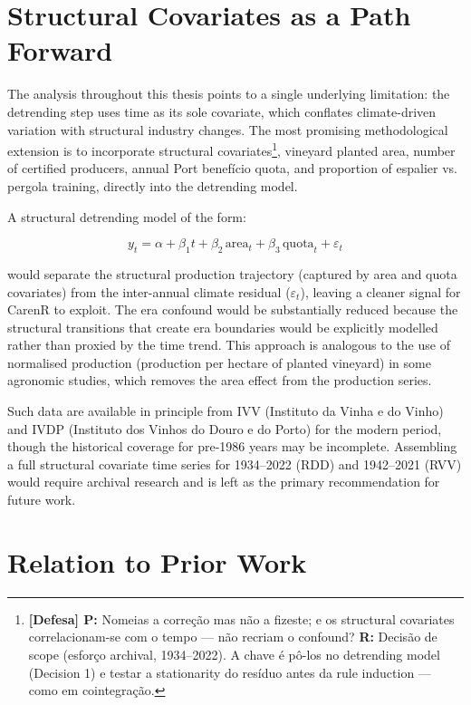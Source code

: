 \section{Structural Covariates as a Path Forward}\label{sec:structural_covariates_as_a}

The analysis throughout this thesis points to a single underlying limitation: the detrending step uses time as its sole covariate, which conflates climate-driven variation with structural industry changes. The most promising methodological extension is to incorporate structural covariates\footnote{\textbf{[Defesa] P:} Nomeias a correção mas não a fizeste; e os structural covariates correlacionam-se com o tempo --- não recriam o confound? \textbf{R:} Decisão de scope (esforço archival, 1934--2022). A chave é pô-los no detrending model (Decision 1) e testar a stationarity do resíduo antes da rule induction --- como em cointegração.}, vineyard planted area, number of certified producers, annual Port benefício quota, and proportion of espalier vs. pergola training, directly into the detrending model.

A structural detrending model of the form:

\begin{equation}
  y_t = \alpha + \beta_1 t + \beta_2 \,\text{area}_t + \beta_3 \,\text{quota}_t + \varepsilon_t
  \label{eq:structural_detrend}
\end{equation}

would separate the structural production trajectory (captured by area and quota covariates) from the inter-annual climate residual ($\varepsilon_t$), leaving a cleaner signal for CarenR to exploit. The era confound would be substantially reduced because the structural transitions that create era boundaries would be explicitly modelled rather than proxied by the time trend. This approach is analogous to the use of normalised production (production per hectare of planted vineyard) in some agronomic studies, which removes the area effect from the production series.

Such data are available in principle from IVV (Instituto da Vinha e do Vinho) and IVDP (Instituto dos Vinhos do Douro e do Porto) for the modern period, though the historical coverage for pre-1986 years may be incomplete. Assembling a full structural covariate time series for 1934--2022 (RDD) and 1942--2021 (RVV) would require archival research and is left as the primary recommendation for future work.


\section{Relation to Prior Work}\label{sec:relation_to_prior_work}

